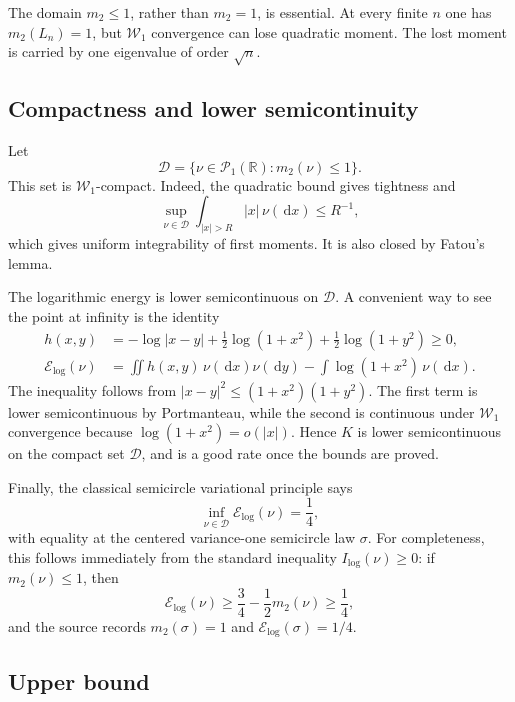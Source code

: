 \documentclass[11pt]{article}
\newcommand{\R}{\mathbb R}
\newcommand{\Pone}{\mathcal P_1(\R)}
\newcommand{\W}{\mathcal W}
\newcommand{\E}{\mathcal E_{\log}}
\newcommand{\dd}{\,\mathrm d}
\begin{document}
The domain $m_2\le1$, rather than $m_2=1$, is essential. At every finite
$n$ one has $m_2(L_n)=1$, but $\W_1$ convergence can lose quadratic moment.
The lost moment is carried by one eigenvalue of order $\sqrt n$.

\subsection{Compactness and lower semicontinuity}

Let
\[
 \mathcal D=\{\nu\in\Pone:m_2(\nu)\le1\}.
\]
This set is $\W_1$-compact. Indeed, the quadratic bound gives tightness and
\[
 \sup_{\nu\in\mathcal D}\int_{|x|>R}|x|\,\nu(\dd x)\le R^{-1},
\]
which gives uniform integrability of first moments. It is also closed by
Fatou's lemma.

The logarithmic energy is lower semicontinuous on $\mathcal D$. A convenient
way to see the point at infinity is the identity
\begin{align}\label{eq:positive-kernel}
 h(x,y)&=-\log|x-y|+\frac12\log(1+x^2)
                    +\frac12\log(1+y^2)\ge0,\\
 \E(\nu)&=\iint h(x,y)\,\nu(\dd x)\nu(\dd y)
          -\int\log(1+x^2)\,\nu(\dd x).
\end{align}
The inequality follows from
$|x-y|^2\le(1+x^2)(1+y^2)$. The first term is lower semicontinuous by
Portmanteau, while the second is continuous under $\W_1$ convergence because
$\log(1+x^2)=o(|x|)$. Hence $K$ is lower semicontinuous on the compact set
$\mathcal D$, and is a good rate once the bounds are proved.

Finally, the classical semicircle variational principle says
\begin{equation}\label{eq:variational}
 \inf_{\nu\in\mathcal D}\E(\nu)=\frac14,
\end{equation}
with equality at the centered variance-one semicircle law $\sigma$. For
completeness, this follows immediately from the standard inequality
$I_{\log}(\nu)\ge0$: if $m_2(\nu)\le1$, then
\[
 \E(\nu)\ge\frac34-\frac12m_2(\nu)\ge\frac14,
\]
and the source records $m_2(\sigma)=1$ and $\E(\sigma)=1/4$.

\subsection{Upper bound}
\end{document}
